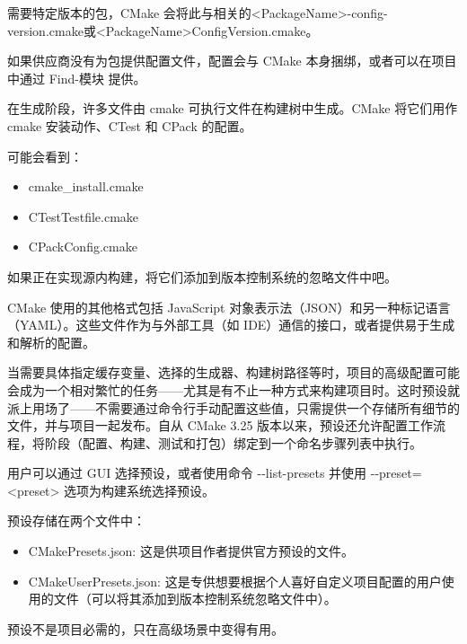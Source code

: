 需要特定版本的包，CMake 会将此与相关的<PackageName>-config-version.cmake或<PackageName>ConfigVersion.cmake。

如果供应商没有为包提供配置文件，配置会与 CMake 本身捆绑，或者可以在项目中通过 Find-模块 提供。


在生成阶段，许多文件由 cmake 可执行文件在构建树中生成。CMake 将它们用作 cmake 安装动作、CTest 和 CPack 的配置。

可能会看到：

\begin{itemize}
\item
cmake\_install.cmake

\item
CTestTestfile.cmake

\item
CPackConfig.cmake
\end{itemize}

如果正在实现源内构建，将它们添加到版本控制系统的忽略文件中吧。


CMake 使用的其他格式包括 JavaScript 对象表示法（JSON）和另一种标记语言（YAML）。这些文件作为与外部工具（如 IDE）通信的接口，或者提供易于生成和解析的配置。


当需要具体指定缓存变量、选择的生成器、构建树路径等时，项目的高级配置可能会成为一个相对繁忙的任务——尤其是有不止一种方式来构建项目时。这时预设就派上用场了——不需要通过命令行手动配置这些值，只需提供一个存储所有细节的文件，并与项目一起发布。自从 CMake 3.25 版本以来，预设还允许配置工作流程，将阶段（配置、构建、测试和打包）绑定到一个命名步骤列表中执行。

用户可以通过 GUI 选择预设，或者使用命令 -{}-list-presets 并使用 -{}-preset=<preset> 选项为构建系统选择预设。

预设存储在两个文件中：

\begin{itemize}
\item
CMakePresets.json: 这是供项目作者提供官方预设的文件。

\item
CMakeUserPresets.json: 这是专供想要根据个人喜好自定义项目配置的用户使用的文件（可以将其添加到版本控制系统忽略文件中）。
\end{itemize}

预设不是项目必需的，只在高级场景中变得有用。


